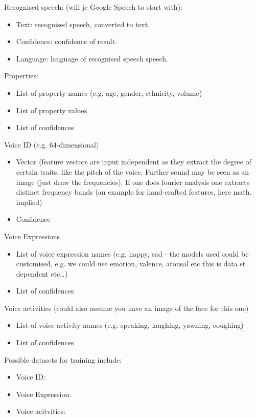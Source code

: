 Recognised speech: (will je Google Speech to start with):
\begin{itemize}
\item Text: recognised speech, converted to text.
\item Confidence: confidence of result.
\item Language: language of recognised speech speech.
\end{itemize}
Properties:
\begin{itemize}
\item List of property names (e.g. age, gender, ethnicity, volume)
\item List of property values
\item List of confidences
\end{itemize}
Voice ID (e.g. 64-dimensional)
\begin{itemize}
\item Vector (feature vectors are input independent as they extract the degree of certain traits, like the pitch of the voice. Further sound may be seen as an image (just draw the frequencies). If one does fourier analysis one extracts distinct frequency bands (an example for hand-crafted features, here math. implied)
\item Confidence
\end{itemize}
Voice Expressions
\begin{itemize}
\item List of voice expression names (e.g. happy, sad - the models used could be customised, e.g. we could use emotion, valence, arousal etc this is data st dependent etc…)
\item List of confidences
\end{itemize}
Voice activities (could also assume you have an image of the face for this one)
\begin{itemize}
\item List of voice activity names (e.g. speaking, laughing, yawning, coughing)
\item List of confidences
\end{itemize}

Possible datasets for training include:
\begin{itemize}
\item Voice ID: %
\item Voice Expression: %
\item Voice acitvities: %
\end{itemize}

